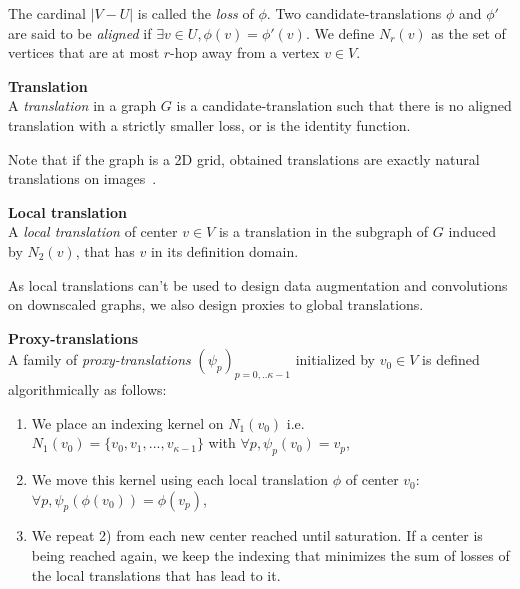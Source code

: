 The cardinal $|V-U|$ is called the \emph{loss} of $\phi$.
Two candidate-translations $\phi$ and $\phi'$ are said to be \emph{aligned} if $\exists v\in U, \phi(v) = \phi'(v)$.
We define $N_r(v)$ as the set of vertices that are at most $r$-hop away from a vertex $v \in V$.\\

\begin{definition}\textbf{Translation}\\
  A \emph{translation} in a graph $G$ is a candidate-translation such that there is no aligned translation with a strictly smaller loss, or is the identity function.
\end{definition}

Note that if the graph is a 2D grid, obtained translations are exactly natural translations on images~\cite{GrePasViaGri201610}.\\

\begin{definition}\textbf{Local translation}\\
A \emph{local translation} of center $v \in V$ is a translation in the subgraph of $G$ induced by $N_2(v)$, that has $v$ in its definition domain.
\end{definition}

As local translations can't be used to design data augmentation and convolutions on downscaled graphs, we also design proxies to global translations.

\begin{definition}\textbf{Proxy-translations}\\
A family of \emph{proxy-translations} $(\psi_p)_{p=0,..\kappa-1}$ initialized by $v_0 \in V$ is defined algorithmically as follows:
\begin{enumerate}
\item We place an indexing kernel on $N_1(v_0) $ i.e.\\ $N_1(v_0) = \{v_0, v_1, ..., v_{\kappa-1}\}$ with $\forall p, \psi_p(v_0) = v_p$,
\item We move this kernel using each local translation $\phi$ of center $v_0$: $\forall p, \psi_p(\phi(v_0)) = \phi(v_p)$,
\item We repeat 2) from each new center reached until saturation. If a center is being reached again, we keep the indexing that minimizes the sum of losses of the local translations that has lead to it.
\end{enumerate}
\end{definition}

